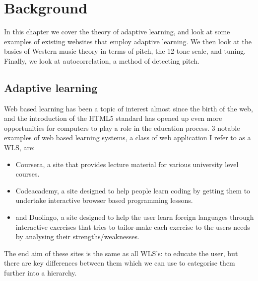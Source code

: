 \chapter{Background}

In this chapter we cover the theory of adaptive learning, and look at some examples of existing websites that employ adaptive learning. We then look at the basics of Western music theory in terms of pitch, the 12-tone scale, and tuning. Finally, we look at autocorrelation, a method of detecting pitch.
	\section{Adaptive learning}
	Web based learning has been a topic of interest almost since the birth of the web\cite{alexander1995teaching}, and the introduction of the HTML5 standard has opened up even more opportunities for computers to play a role in the education process\cite{griffiths2012profile}. 3 notable examples of web based learning systems, a class of web application I refer to as a WLS, are:
	\begin{itemize}
		\item Coursera, a site that provides lecture material for various university level courses.
		\item  Codeacademy, a site designed to help people learn coding by getting them to undertake interactive browser based programming lessons.
		\item and Duolingo, a site designed to help the user learn foreign languages through interactive exercises that tries to tailor-make each exercise to the users needs by analysing their strengths/weaknesses.
	\end{itemize}
	The end aim of these sites is the same as all WLS's: to educate the user, but there are key differences between them which we can use to categorise them further into a hierarchy.
